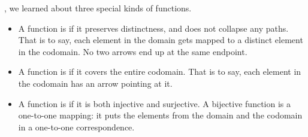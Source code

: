\documentclass[../../../main.tex]{subfiles}
\begin{document}
, we learned about three special kinds of functions. 

\begin{itemize}

  \item A function is  if it preserves distinctness, and does not collapse any paths. That is to say, each element in the domain gets mapped to a distinct element in the codomain. No two arrows end up at the same endpoint.
  
  \item A function is  if it covers the entire codomain. That is to say, each element in the codomain has an arrow pointing at it.
  
  \item A function is  if it is both injective and surjective. A bijective function is a one-to-one mapping: it puts the elements from the domain and the codomain in a one-to-one correspondence.

\end{itemize}
\end{document}
